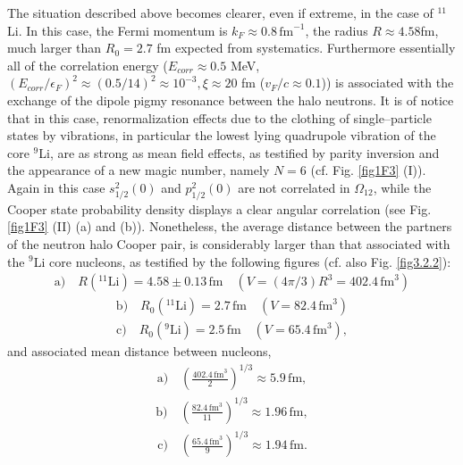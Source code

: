 The situation described above becomes clearer, even if extreme, in the case of $^{11}$Li. In this case, the Fermi momentum is $k_F\approx 0.8\, \text{fm}^{-1}$, the radius $R\approx 4.58 $fm, much larger than $R_0=2.7$ fm expected from systematics. Furthermore essentially all of the correlation energy ($E_{corr}\approx 0.5$ MeV, $(E_{corr}/\epsilon_F)^2\approx (0.5/14)^2\approx 10^{-3}, \xi\approx 20 $ fm ($v_F/c\approx0.1$)) is associated with the exchange of the dipole pigmy resonance between the halo neutrons. It is of notice that in this case, renormalization effects due to the clothing of single--particle states by vibrations, in particular the lowest lying quadrupole vibration of the core $^9$Li, are as strong as mean field effects, as testified by parity inversion and the appearance of a new magic number, namely $N=6$ (cf. Fig. \ref{fig1F3} (I)). Again in this case $s_{1/2}^2(0)$ and $p_{1/2}^2(0)$ are not correlated in $\Omega_{12}$, while the Cooper state probability density displays a clear angular correlation (see Fig. \ref{fig1F3} (II) (a) and (b)). Nonetheless, the average distance between the partners of the neutron halo Cooper pair, is considerably larger than that associated with the $^9$Li core nucleons, as testified by the following figures (cf. also Fig. \ref{fig3.2.2}):
\begin{align}\label{eq3.2.21}
 \text{a)}\quad R(^{11}\text{Li})= 4.58\pm 0.13 \,\text{fm}\quad (V=\left(4\pi/3\right)R^3=402.4 \,\text{fm}^3)
\end{align}
\begin{align}
 \text{b)}\quad R_0 (^{11}\text{Li})=2.7\,\text{fm}\quad (V=82.4\,\text{fm}^3)
\end{align}
\begin{align}
 \text{c)}\quad R_0 (^{9}\text{Li})=2.5\,\text{fm}\quad (V=65.4\,\text{fm}^3),
\end{align}
and associated mean distance between nucleons, 
\begin{align}
 \text{a)}\quad \left(\frac{402.4\,\text{fm}^3}{2}\right)^{1/3}\approx 5.9\,\text{fm},
\end{align}
\begin{align}
 \text{b)}\quad \left(\frac{82.4\,\text{fm}^3}{11}\right)^{1/3}\approx 1.96\,\text{fm},
\end{align}
\begin{align}
 \text{c)}\quad \left(\frac{65.4\,\text{fm}^3}{9}\right)^{1/3}\approx 1.94\,\text{fm}.
\end{align}



